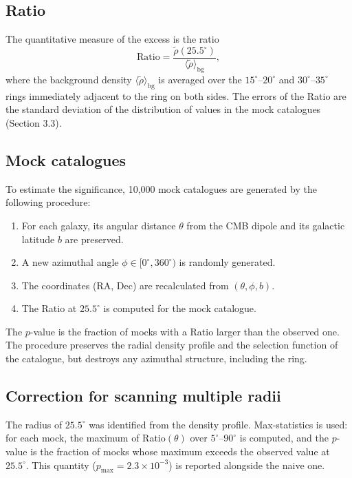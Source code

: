 \documentclass[11pt,a4paper]{article}
\begin{document}
\subsection{Ratio}
The quantitative measure of the excess is the ratio
\begin{equation}
\text{Ratio} = \frac{\tilde{\rho}(25.5^\circ)}{\langle \tilde{\rho} \rangle_{\text{bg}}},
\end{equation}
where the background density \(\langle \tilde{\rho} \rangle_{\text{bg}}\) is averaged over the \(15^\circ\)--\(20^\circ\) and \(30^\circ\)--\(35^\circ\) rings immediately adjacent to the ring on both sides. The errors of the Ratio are the standard deviation of the distribution of values in the mock catalogues (Section 3.3).

\subsection{Mock catalogues}
To estimate the significance, 10,000 mock catalogues are generated by the following procedure:
\begin{enumerate}
\item For each galaxy, its angular distance \(\theta\) from the CMB dipole and its galactic latitude \(b\) are preserved.
\item A new azimuthal angle \(\phi \in [0^\circ, 360^\circ)\) is randomly generated.
\item The coordinates (RA, Dec) are recalculated from \((\theta, \phi, b)\).
\item The Ratio at \(25.5^\circ\) is computed for the mock catalogue.
\end{enumerate}
The \(p\)-value is the fraction of mocks with a Ratio larger than the observed one. The procedure preserves the radial density profile and the selection function of the catalogue, but destroys any azimuthal structure, including the ring.

\subsection{Correction for scanning multiple radii}
The radius of \(25.5^\circ\) was identified from the density profile. Max-statistics is used: for each mock, the maximum of Ratio\((\theta)\) over \(5^\circ\)--\(90^\circ\) is computed, and the \(p\)-value is the fraction of mocks whose maximum exceeds the observed value at \(25.5^\circ\). This quantity (\(p_{\max} = 2.3 \times 10^{-3}\)) is reported alongside the naive one.
\end{document}
